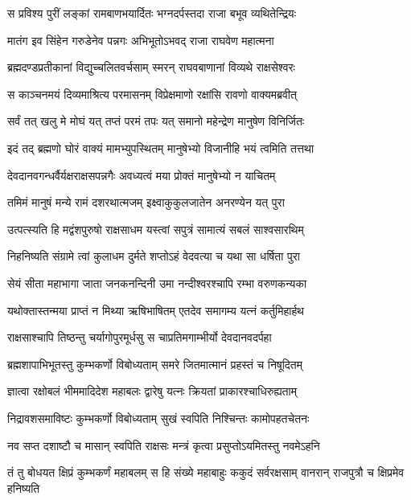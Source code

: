 
\twolineshloka
{स प्रविश्य पुरीं लङ्कां रामबाणभयार्दितः}
{भग्नदर्पस्तदा राजा बभूव व्यथितेन्द्रियः} %

\twolineshloka
{मातंग इव सिंहेन गरुडेनेव पन्नगः}
{अभिभूतोऽभवद् राजा राघवेण महात्मना} %

\twolineshloka
{ब्रह्मदण्डप्रतीकानां विद्युच्चलितवर्चसाम्}
{स्मरन् राघवबाणानां विव्यथे राक्षसेश्वरः} %

\twolineshloka
{स काञ्चनमयं दिव्यमाश्रित्य परमासनम्}
{विप्रेक्षमाणो रक्षांसि रावणो वाक्यमब्रवीत्} %

\twolineshloka
{सर्वं तत् खलु मे मोघं यत् तप्तं परमं तपः}
{यत् समानो महेन्द्रेण मानुषेण विनिर्जितः} %

\twolineshloka
{इदं तद् ब्रह्मणो घोरं वाक्यं मामभ्युपस्थितम्}
{मानुषेभ्यो विजानीहि भयं त्वमिति तत्तथा} %

\twolineshloka
{देवदानवगन्धर्वैर्यक्षराक्षसपन्नगैः}
{अवध्यत्वं मया प्रोक्तं मानुषेभ्यो न याचितम्} %

\twolineshloka
{तमिमं मानुषं मन्ये रामं दशरथात्मजम्}
{इक्ष्वाकुकुलजातेन अनरण्येन यत् पुरा} %

\twolineshloka
{उत्पत्स्यति हि मद्वंशपुरुषो राक्षसाधम}
{यस्त्वां सपुत्रं सामात्यं सबलं साश्वसारथिम्} %

\twolineshloka
{निहनिष्यति संग्रामे त्वां कुलाधम दुर्मते}
{शप्तोऽहं वेदवत्या च यथा सा धर्षिता पुरा} %

\twolineshloka
{सेयं सीता महाभागा जाता जनकनन्दिनी}
{उमा नन्दीश्वरश्चापि रम्भा वरुणकन्यका} %

\twolineshloka
{यथोक्तास्तन्मया प्राप्तं न मिथ्या ऋषिभाषितम्}
{एतदेव समागम्य यत्नं कर्तुमिहार्हथ} %

\twolineshloka
{राक्षसाश्चापि तिष्ठन्तु चर्यागोपुरमूर्धसु}
{स चाप्रतिमगाम्भीर्यो देवदानवदर्पहा} %

\twolineshloka
{ब्रह्मशापाभिभूतस्तु कुम्भकर्णो विबोध्यताम्}
{समरे जितमात्मानं प्रहस्तं च निषूदितम्} %

\twolineshloka
{ज्ञात्वा रक्षोबलं भीममादिदेश महाबलः}
{द्वारेषु यत्नः क्रियतां प्राकारश्चाधिरुह्यताम्} %

\twolineshloka
{निद्रावशसमाविष्टः कुम्भकर्णो विबोध्यताम्}
{सुखं स्वपिति निश्चिन्तः कामोपहतचेतनः} %

\twolineshloka
{नव सप्त दशाष्टौ च मासान् स्वपिति राक्षसः}
{मन्त्रं कृत्वा प्रसुप्तोऽयमितस्तु नवमेऽहनि} %

\threelineshloka
{तं तु बोधयत क्षिप्रं कुम्भकर्णं महाबलम्}
{स हि संख्ये महाबाहुः ककुदं सर्वरक्षसाम्}
{वानरान् राजपुत्रौ च क्षिप्रमेव हनिष्यति} %

